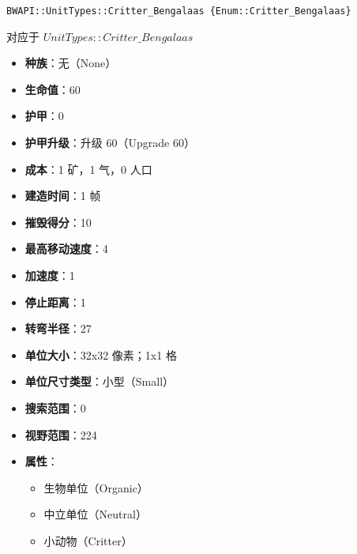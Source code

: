 \begin{tcolorbox}[colback=white, colframe=black!60!white, title=Critter\_Bengalaas(), arc=0mm]
    \begin{verbatim}
BWAPI::UnitTypes::Critter_Bengalaas {Enum::Critter_Bengalaas}
    \end{verbatim}
    对应于  $UnitTypes::Critter\_Bengalaas$ 
    \begin{itemize}
        \item \textbf{种族}：无（None）
        \item \textbf{生命值}：60
        \item \textbf{护甲}：0
        \item \textbf{护甲升级}：升级 60（Upgrade 60）
        \item \textbf{成本}：1 矿，1 气，0 人口
        \item \textbf{建造时间}：1 帧
        \item \textbf{摧毁得分}：10
        \item \textbf{最高移动速度}：4
        \item \textbf{加速度}：1
        \item \textbf{停止距离}：1
        \item \textbf{转弯半径}：27
        \item \textbf{单位大小}：32x32 像素；1x1 格
        \item \textbf{单位尺寸类型}：小型（Small）
        \item \textbf{搜索范围}：0
        \item \textbf{视野范围}：224
        \item \textbf{属性}：
            \begin{itemize}
                \item 生物单位（Organic）
                \item 中立单位（Neutral）
                \item 小动物（Critter）
            \end{itemize}
    \end{itemize}
\end{tcolorbox}

